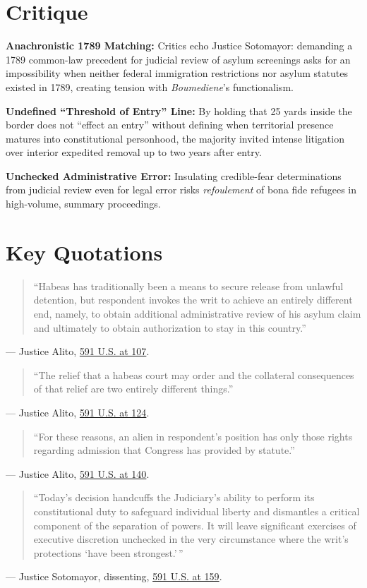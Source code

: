 \documentclass[12pt]{article}
\begin{document}
\section{Critique}
\textbf{Anachronistic 1789 Matching:} Critics echo Justice Sotomayor: demanding a 1789 common-law precedent for judicial review of asylum screenings asks for an impossibility when neither federal immigration restrictions nor asylum statutes existed in 1789, creating tension with \textit{Boumediene}'s functionalism.

\textbf{Undefined ``Threshold of Entry'' Line:} By holding that 25 yards inside the border does not ``effect an entry'' without defining when territorial presence matures into constitutional personhood, the majority invited intense litigation over interior expedited removal up to two years after entry.

\textbf{Unchecked Administrative Error:} Insulating credible-fear determinations from judicial review even for legal error risks \textit{refoulement} of bona fide refugees in high-volume, summary proceedings.

\section{Key Quotations}
\begin{quote}
``Habeas has traditionally been a means to secure release from unlawful detention, but respondent invokes the writ to achieve an entirely different end, namely, to obtain additional administrative review of his asylum claim and ultimately to obtain authorization to stay in this country.''
\end{quote}
\noindent --- Justice Alito, \href{https://www.law.cornell.edu/supremecourt/text/19-161}{591 U.S. at 107}.

\begin{quote}
``The relief that a habeas court may order and the collateral consequences of that relief are two entirely different things.''
\end{quote}
\noindent --- Justice Alito, \href{https://www.law.cornell.edu/supremecourt/text/19-161}{591 U.S. at 124}.

\begin{quote}
``For these reasons, an alien in respondent's position has only those rights regarding admission that Congress has provided by statute.''
\end{quote}
\noindent --- Justice Alito, \href{https://www.law.cornell.edu/supremecourt/text/19-161}{591 U.S. at 140}.

\begin{quote}
``Today's decision handcuffs the Judiciary's ability to perform its constitutional duty to safeguard individual liberty and dismantles a critical component of the separation of powers. It will leave significant exercises of executive discretion unchecked in the very circumstance where the writ's protections `have been strongest.'\,''
\end{quote}
\noindent --- Justice Sotomayor, dissenting, \href{https://www.law.cornell.edu/supremecourt/text/19-161}{591 U.S. at 159}.
\end{document}
